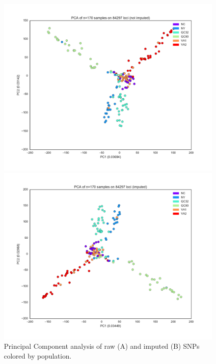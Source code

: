 \documentclass[smallextended]{svjour3}
\begin{document}
\newpage

\begin{figure}[h]
\begin{minipage}[b]{.5\linewidth}
	\centering
	\includegraphics[width=\textwidth]{not_imputed}	
	\subcaption{}
\end{minipage}
\hfill
\begin{minipage}[b]{.5\linewidth}
	\centering
	\includegraphics[width=\textwidth]{imputed}	
	\subcaption{}
\end{minipage}
\caption{Principal Component analysis of raw (A) and imputed (B) SNPs colored 
by population.}
\label{fig:pcas}
\end{figure}
\end{document}
